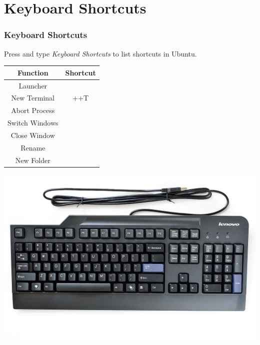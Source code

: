 \documentclass[fleqn]{beamer} %
\newcommand{\sectiontitleIII}{Keyboard Shortcuts}
\begin{document}
\section{\sectiontitleIII}	
	\begin{frame}[label=sectionIII] \small
		\frametitle{\sectiontitleIII}
		Press \WinKey and type {\it Keyboard Shortcuts} to list shortcuts in Ubuntu.
		
		\begin{multicols}{2}
		
		\renewcommand{\arraystretch}{1.4}
		\begin{tabular}{|c|c|}\hline
			Function & Shortcut \\ \hline
			Launcher &\WinKey  \\
			New Terminal &\CTRLKey+\ALTKey+T \\
			Abort Process &\\
		    Switch Windows &\\
			Close Window & \\
			Rename &\\
			New Folder & \\ \hline						
		\end{tabular}
			
		\hspace{10mm}\includegraphics[scale=.10]{lenovo_keyboard.jpg} 
       	       
        \end{multicols}

	\end{frame}      
	
\end{document}
